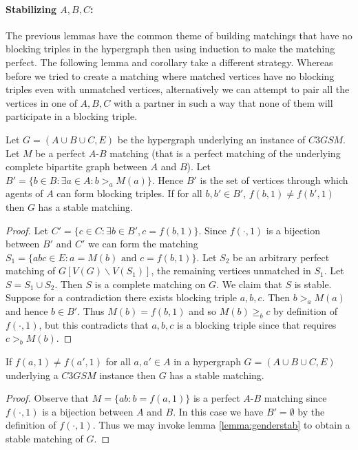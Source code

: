 \begin{definition}
\paragraph{Stabilizing $A,B,C$:}
The previous lemmas have the common theme of building matchings that have no blocking triples in the hypergraph then using induction to make the matching perfect. The following lemma and corollary take a different strategy. Whereas before we tried to create a matching where matched vertices have no blocking triples even with unmatched vertices, alternatively we can attempt to pair all the vertices in one of $A,B,C$ with a partner in such a way that none of them will participate in a blocking triple.
\begin{lemma}\label{lemma:genderstab}
Let $G=(A\cup B\cup C, E)$ be the hypergraph underlying an instance of $C3GSM$. Let $M$ be a perfect $A$-$B$ matching (that is a perfect matching of the underlying complete bipartite graph between $A$ and $B$). Let $B' = \{ b \in B : \exists a \in A : b >_a M(a) \}$. Hence $B'$ is the set of vertices through which agents of $A$ can form blocking triples. If for all $b, b' \in B'$, $f(b,1) \neq f(b',1)$ then $G$ has a stable matching.
\end{lemma}
\begin{proof}
Let $C' = \{ c \in C : \exists b\in B', c = f(b,1)\}$. Since $f(\cdot,1)$ is a bijection between $B'$ and $C'$ we can form the matching $S_1 = \{abc \in E: a = M(b)\text{ and } c = f(b,1)\}$. Let $S_2$ be an arbitrary perfect matching of $G[V(G) \backslash V(S_1)]$, the remaining vertices unmatched in $S_1$. Let $S = S_1 \cup S_2$. Then $S$ is a complete matching on $G$. We claim that $S$ is stable. Suppose for a contradiction there exists blocking triple $a,b,c$. Then $b >_a M(a)$ and hence $b \in B'$. Thus $M(b) = f(b,1)$ and so $M(b) \geq_b c$ by definition of $f(\cdot,1)$, but this contradicts that $a,b,c$ is a blocking triple since that requires $c >_b M(b)$.
\end{proof}
\begin{corollary}
If $f(a,1) \neq f(a',1)$ for all $a,a' \in A$ in a hypergraph $G=(A\cup B \cup C, E)$ underlying a $C3GSM$ instance then $G$ has a stable matching.
\end{corollary}
\begin{proof}
Observe that $M = \{ab : b = f(a,1)\}$ is a perfect $A$-$B$ matching since $f(\cdot, 1)$ is a bijection between $A$ and $B$. In this case we have $B' = \emptyset$ by the definition of $f(\cdot,1)$. Thus we may invoke lemma \ref{lemma:genderstab} to obtain a stable matching of $G$.

\end{proof}
\end{definition}
